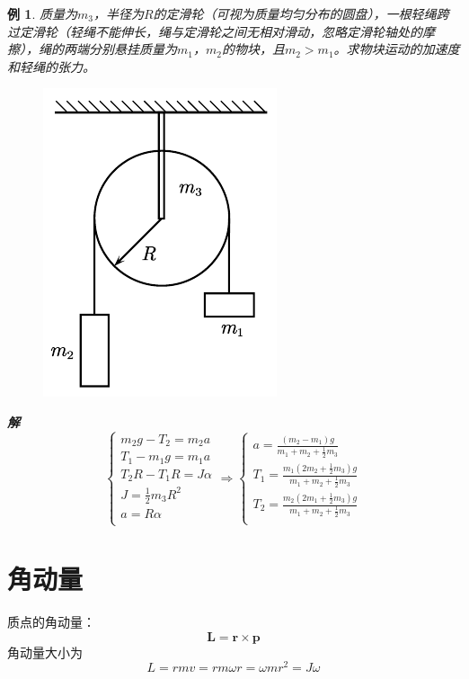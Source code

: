 \documentclass[12pt, a4paper, twoside]{ctexbook}
\newtheorem{example}[theorem]{例}
\begin{document}
\begin{example}
    质量为$m_3$，半径为$R$的定滑轮（可视为质量均匀分布的圆盘），一根轻绳跨过定滑轮（轻绳不能伸长，绳与定滑轮之间无相对滑动，忽略定滑轮轴处的摩擦），绳的两端分别悬挂质量为$m_1$，$m_2$的物块，且$m_2>m_1$。求物块运动的加速度和轻绳的张力。
    \begin{figure}[H]
        \centerline{\includegraphics[scale=0.8]{CH03EX02.pdf}}
    \end{figure}
    \noindent\textbf{解}
    $$
    \left\{ \begin{array}{l}
        m_2g-T_2=m_2a\\
        T_1-m_1g=m_1a\\
        T_2R-T_1R=J\alpha\\
        J=\frac{1}{2}m_3R^2\\
        a=R\alpha\\
    \end{array} \right. \Rightarrow 
    \left\{ \begin{array}{l}
        a=\frac{\left( m_2-m_1 \right) g}{m_1+m_2+\frac{1}{2}m_3}\\
        T_1=\frac{m_1\left( 2m_2+\frac{1}{2}m_3 \right) g}{m_1+m_2+\frac{1}{2}m_3}\\
        T_2=\frac{m_2\left( 2m_1+\frac{1}{2}m_3 \right) g}{m_1+m_2+\frac{1}{2}m_3}\\
    \end{array} \right. 
    $$
\end{example}
\section{角动量}
{\sonti 质点的角动量}：
$$
\boldsymbol{L}=\boldsymbol{r}\times\boldsymbol{p}
$$
角动量大小为
$$
L=rmv=rm\omega r=\omega mr^2=J\omega
$$
\end{document}
